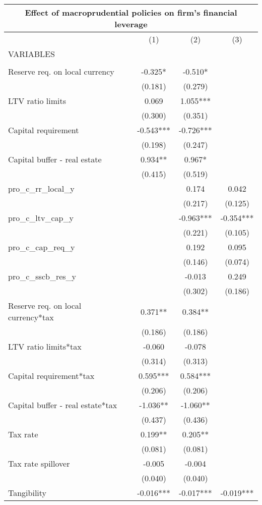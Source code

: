 \begin{tabular}{lccc}
\multicolumn{4}{c}{Effect of macroprudential policies on firm's financial leverage} \\ \hline
 & (1) & (2) & (3) \\
VARIABLES &  &  &  \\ \hline
 &  &  &  \\
Reserve req. on local currency & -0.325* & -0.510* &  \\
 & (0.181) & (0.279) &  \\
LTV ratio limits & 0.069 & 1.055*** &  \\
 & (0.300) & (0.351) &  \\
Capital requirement & -0.543*** & -0.726*** &  \\
 & (0.198) & (0.247) &  \\
Capital buffer - real estate & 0.934** & 0.967* &  \\
 & (0.415) & (0.519) &  \\
pro\_c\_rr\_local\_y &  & 0.174 & 0.042 \\
 &  & (0.217) & (0.125) \\
pro\_c\_ltv\_cap\_y &  & -0.963*** & -0.354*** \\
 &  & (0.221) & (0.105) \\
pro\_c\_cap\_req\_y &  & 0.192 & 0.095 \\
 &  & (0.146) & (0.074) \\
pro\_c\_sscb\_res\_y &  & -0.013 & 0.249 \\
 &  & (0.302) & (0.186) \\
Reserve req. on local currency*tax & 0.371** & 0.384** &  \\
 & (0.186) & (0.186) &  \\
LTV ratio limits*tax & -0.060 & -0.078 &  \\
 & (0.314) & (0.313) &  \\
Capital requirement*tax & 0.595*** & 0.584*** &  \\
 & (0.206) & (0.206) &  \\
Capital buffer - real estate*tax & -1.036** & -1.060** &  \\
 & (0.437) & (0.436) &  \\
Tax rate & 0.199** & 0.205** &  \\
 & (0.081) & (0.081) &  \\
Tax rate spillover & -0.005 & -0.004 &  \\
 & (0.040) & (0.040) &  \\
Tangibility & -0.016*** & -0.017*** & -0.019*** \\

\end{tabular}
